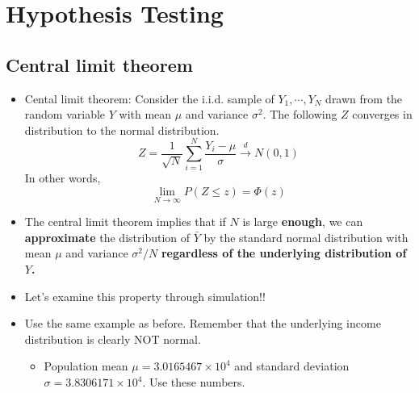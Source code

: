 \documentclass[]{book}
\providecommand{\tightlist}{%
  \setlength{\itemsep}{0pt}\setlength{\parskip}{0pt}}
\begin{document}
\hypertarget{hypothesis-testing}{%
\section{Hypothesis Testing}\label{hypothesis-testing}}

\hypertarget{central-limit-theorem}{%
\subsection{Central limit theorem}\label{central-limit-theorem}}

\begin{itemize}
\item
  Cental limit theorem: Consider the i.i.d. sample of \(Y_1,\cdots, Y_N\) drawn from the random variable \(Y\) with mean \(\mu\) and variance \(\sigma^2\). The following \(Z\) converges in distribution to the normal distribution.
  \[
  Z = \frac{1}{\sqrt{N}} \sum_{i=1}^N \frac{Y_i - \mu}{\sigma } \overset{d}{\rightarrow}N(0,1)
  \]
  In other words,
  \[
  \lim_{N\rightarrow\infty}P\left(Z \leq z\right)=\Phi(z)
  \]
\item
  The central limit theorem implies that if \(N\) is large \textbf{enough}, we can \textbf{approximate} the distribution of \(\bar{Y}\) by the standard normal distribution with mean \(\mu\) and variance \(\sigma^2 / N\) \textbf{regardless of the underlying distribution of \(Y\).}
\item
  Let's examine this property through simulation!!
\item
  Use the same example as before. Remember that the underlying income distribution is clearly NOT normal.

  \begin{itemize}
  \tightlist
  \item
    Population mean \(\mu = 3.0165467\times 10^{4}\) and standard deviation \(\sigma = 3.8306171\times 10^{4}\). Use these numbers.
  \end{itemize}
\end{itemize}
\end{document}
